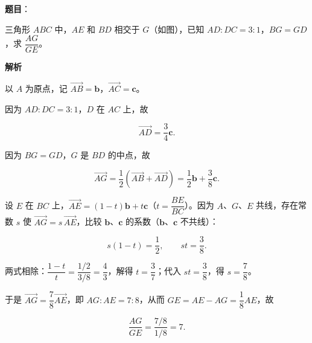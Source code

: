 \begin{answer}

\textbf{题目}：

三角形 $ABC$ 中，$AE$ 和 $BD$ 相交于 $G$（如图），已知 $AD:DC=3:1$，$BG=GD$，求 $\dfrac{AG}{GE}$。
\nopagebreak[4]
\begin{center}\end{center}
\nopagebreak[4]
\textbf{解析}
\nopagebreak[4]
\begin{center}\end{center}
\nopagebreak[4]
以 $A$ 为原点，记 $\vec{AB}=\boldsymbol b$，$\vec{AC}=\boldsymbol c$。

因为 $AD:DC=3:1$，$D$ 在 $AC$ 上，故

\nopagebreak[4]
\[
\vec{AD}=\frac34\boldsymbol c.
\]

因为 $BG=GD$，$G$ 是 $BD$ 的中点，故

\nopagebreak[4]
\[
\vec{AG}=\frac12\left(\vec{AB}+\vec{AD}\right)=\frac12\boldsymbol b+\frac38\boldsymbol c.
\]

设 $E$ 在 $BC$ 上，$\vec{AE}=(1-t)\boldsymbol b+t\boldsymbol c$（$t=\dfrac{BE}{BC}$）。因为 $A$、$G$、$E$ 共线，存在常数 $s$ 使 $\vec{AG}=s\,\vec{AE}$，比较 $\boldsymbol b$、$\boldsymbol c$ 的系数（$\boldsymbol b$、$\boldsymbol c$ 不共线）：

\nopagebreak[4]
\[
s(1-t)=\frac12,\qquad st=\frac38.
\]

两式相除：$\dfrac{1-t}{t}=\dfrac{1/2}{3/8}=\dfrac43$，解得 $t=\dfrac37$；代入 $st=\dfrac38$，得 $s=\dfrac78$。

于是 $\vec{AG}=\dfrac78\vec{AE}$，即 $AG:AE=7:8$，从而 $GE=AE-AG=\dfrac18AE$，故

\nopagebreak[4]
\[
\frac{AG}{GE}=\frac{7/8}{1/8}=7.
\]


\end{answer}